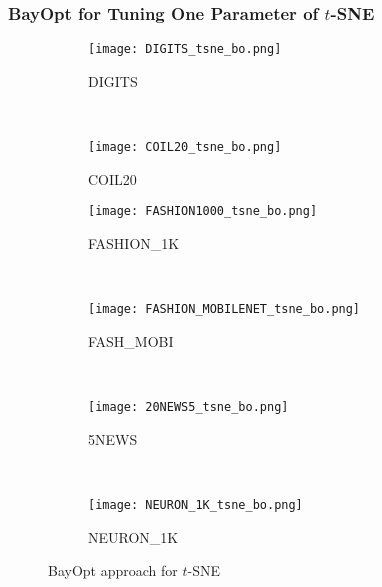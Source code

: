 \subsubsection{BayOpt for Tuning One Parameter of $t$-SNE}\label{sec:result:bo:tsne}

\begin{figure}[ht!]
    \begin{subfigure}[b]{.46\linewidth}
        \centering
        \texttt{[image: DIGITS\_tsne\_bo.png]}
        \caption{DIGITS}
    \end{subfigure}
    ~
    \begin{subfigure}[b]{.46\linewidth}
        \centering
        \texttt{[image: COIL20\_tsne\_bo.png]}
        \caption{COIL20}
    \end{subfigure}
    \vfill
    \begin{subfigure}[b]{.46\linewidth}
        \centering
        \texttt{[image: FASHION1000\_tsne\_bo.png]}
        \caption{{FASHION\_1K}}
    \end{subfigure}
    ~
    \begin{subfigure}[b]{.46\linewidth}
        \centering
        \texttt{[image: FASHION\_MOBILENET\_tsne\_bo.png]}
        \caption{{FASH\_MOBI}}
    \end{subfigure}
    ~
    \vfill
    \begin{subfigure}[b]{.46\linewidth}
        \centering
        \texttt{[image: 20NEWS5\_tsne\_bo.png]}
        \caption{5NEWS}
    \end{subfigure}
    ~
    \begin{subfigure}[b]{.46\linewidth}
        \centering
        \texttt{[image: NEURON\_1K\_tsne\_bo.png]}
        \caption{{NEURON\_1K}}
    \end{subfigure}
    \caption{BayOpt approach for  $t$-SNE}
    \label{fig:tsne:bo:all}
\end{figure}


